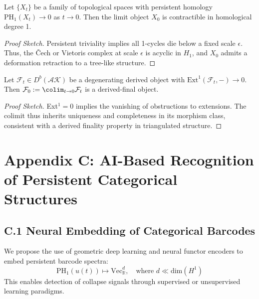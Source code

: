 \documentclass[11pt]{article}
\begin{document}
\begin{lemma}
Let $\{X_t\}$ be a family of topological spaces with persistent homology $\mathrm{PH}_1(X_t) \to 0$ as $t \to 0$.  
Then the limit object $X_0$ is contractible in homological degree 1.
\end{lemma}

\begin{proof}[Proof Sketch]
Persistent triviality implies all 1-cycles die below a fixed scale $\epsilon$.  
Thus, the Čech or Vietoris complex at scale $\epsilon$ is acyclic in $H_1$, and $X_0$ admits a deformation retraction to a tree-like structure.
\end{proof}

\begin{lemma}
Let $\mathcal{F}_t \in D^b(\mathcal{AK})$ be a degenerating derived object with $\mathrm{Ext}^1(\mathcal{F}_t, -) \to 0$.  
Then $\mathcal{F}_0 := \colim_{t \to 0} \mathcal{F}_t$ is a derived-final object.
\end{lemma}

\begin{proof}[Proof Sketch]
Ext$^1 = 0$ implies the vanishing of obstructions to extensions.  
The colimit thus inherits uniqueness and completeness in its morphism class, consistent with a derived finality property in triangulated structure.
\end{proof}



\section*{Appendix C: AI-Based Recognition of Persistent Categorical Structures}

\subsection*{C.1 Neural Embedding of Categorical Barcodes}

We propose the use of geometric deep learning and neural functor encoders to embed persistent barcode spectra:
\[
\mathrm{PH}_1(u(t)) \mapsto \mathrm{Vec}_\mathbb{R}^d, \quad \text{where } d \ll \text{dim}(H^1)
\]
This enables detection of collapse signals through supervised or unsupervised learning paradigms.
\end{document}
